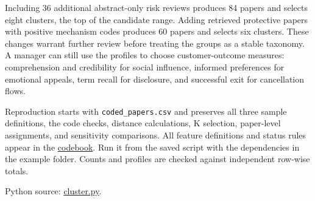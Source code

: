 Including 36 additional abstract-only risk reviews produces 84 papers
and selects eight clusters, the top of the candidate range. Adding
retrieved protective papers with positive mechanism codes produces 60
papers and selects six clusters. These changes warrant further review
before treating the groups as a stable taxonomy. A manager can still use
the profiles to choose customer-outcome measures: comprehension and
credibility for social influence, informed preferences for emotional
appeals, term recall for disclosure, and successful exit for
cancellation flows.

Reproduction starts with \texttt{coded\_papers.csv} and preserves all
three sample definitions, the code checks, distance calculations, K
selection, paper-level assignments, and sensitivity comparisons. All
feature definitions and status rules appear in the
\href{../03_Data_and_Code/Consumer_Agency_Literature/CODEBOOK.md}{codebook}.
Run it from the saved script with the dependencies in the example
folder. Counts and profiles are checked against independent row-wise
totals.

\FloatBarrier
{}
Python source:
\href{../03_Data_and_Code/Consumer_Agency_Literature/cluster.py}{cluster.py}.

